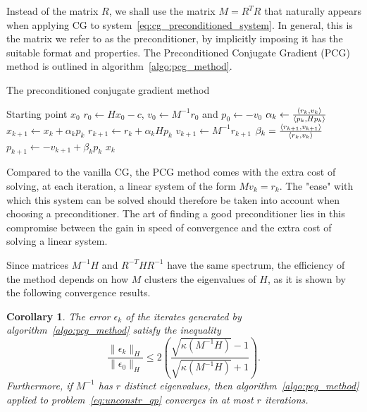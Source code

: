 \documentclass[10pt]{article}
\newtheorem{corollary}[theorem]{Corollary}
\numberwithin{equation}{section}
\begin{document}
	 Instead of the matrix $R$, we shall use the matrix $M=R^TR$ that naturally appears when applying CG to system~\eqref{eq:cg_preconditioned_system}. In general, this is the matrix we refer to as the preconditioner, by implicitly imposing it has the suitable format and properties. The Preconditioned Conjugate Gradient (PCG) method is outlined in algorithm~\ref{algo:pcg_method}.
	 
	 \begin{algorithm}
	 	\caption{The preconditioned conjugate gradient method}\label{algo:pcg_method}
	 	\begin{algorithmic}
	 		\Require Starting point $x_0$
	 		\State $r_0 \gets Hx_0-c$, $v_0\gets M^{-1}r_0$ and $p_0 \gets -v_0$
	 		\State $\alpha_k \gets \frac{\left\langle {r_k} , {v_k} \right\rangle}{\left\langle {p_k} , {Hp_k} \right\rangle}$
	 		\State $x_{k+1} \gets x_k+\alpha_kp_k$
	 		\State $r_{k+1} \gets r_k + \alpha_kHp_k$
	 		\State $v_{k+1}\gets M^{-1}r_{k+1}$
	 		\State $\beta_k =  \frac{\left\langle {r_{k+1}} , {v_{k+1}} \right\rangle}{\left\langle {r_k} , {v_k} \right\rangle}$
	 		\State $p_{k+1} \gets -v_{k+1}+\beta_kp_k$
	 		\EndFor{}
	 		\Return $x_k$
	 	\end{algorithmic}
	 \end{algorithm} 
	 
	 Compared to the vanilla CG, the PCG method comes with the extra cost of solving, at each iteration, a linear system of the form $Mv_k=r_k$. The "ease" with which this system can be solved should therefore be taken into account when choosing a preconditioner. The art of finding a good preconditioner lies in this compromise between the gain in speed of convergence and the extra cost of solving a linear system.
	 
	 Since matrices $M^{-1}H$ and $R^{-T}HR^{-1}$ have the same spectrum, the efficiency of the method depends on how $M$ clusters the eigenvalues of $H$, as it is shown by the following convergence results.
	 
	 \begin{corollary}
	 	\label{corollary:pcg_convergence}
	 	The error $\epsilon_k$ of the iterates generated by algorithm~\ref{algo:pcg_method} satisfy the inequality
	 	\begin{equation}\label{eq:pcg_error_decrease_inequality}
	 		\dfrac{\|\epsilon_k\|_H}{\|\epsilon_0\|_H} \le 2 \left(\dfrac{\sqrt{\kappa(M^{-1}H)}-1}{\sqrt{\kappa(M^{-1}H)}+1}\right).
	 	\end{equation}
	 	Furthermore, if $M^{-1}$ has $r$ distinct eigenvalues, then algorithm~\ref{algo:pcg_method} applied to problem~\eqref{eq:unconstr_qp} converges in at most $r$ iterations.
	 \end{corollary}
	 
\end{document}
